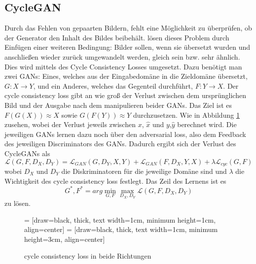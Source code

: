  \subsection{CycleGAN}%
 \label{sub:cyclegan}
 Durch das Fehlen von gepaarten Bildern, fehlt eine Möglichkeit zu überprüfen, ob der Generator den Inhalt des Bildes beibehält. \citeauthor{zhu2017unpaired} \cite{zhu2017unpaired} lösen dieses Problem durch Einfügen einer weiteren Bedingung: Bilder sollen, wenn sie übersetzt wurden und anschließen wieder zurück umgewandelt werden, gleich sein bzw. sehr ähnlich. Dies wird mittels des Cycle Consistency Losses umgesetzt. 
 Dazu benötigt man zwei GANs: Eines, welches aus der Eingabedomäne in die Zieldomäne übersetzt, $G: X \rightarrow Y$, und ein Anderes, welches das Gegenteil durchführt,   $F: Y \rightarrow X$.
 Der cycle consistency loss gibt an wie groß der Verlust zwischen dem ursprünglichen Bild und der Ausgabe nach dem manipulieren beider GANs. 
 Das Ziel ist es $F(G(X))\approx X$ sowie $G(F(Y))\approx Y$ durchzusetzen. Wie in Abbildung \ref{fig:cylce_loss} zusehen, wobei der Verlust jeweils zwischen $x$, $\hat{x}$ und $y$,$\hat{y}$ berechnet wird.
 Die jeweiligen GANs lernen dazu noch über den adversarial loss, also dem Feedback des jeweiligen Discriminators des GANs. 
 Dadurch ergibt sich der Verlust des CycleGANs als
 \[ \mathcal{L}(G,F,D_X,D_Y) = 	\mathcal{L}_{GAN}(G,D_Y,X,Y) + 	\mathcal{L}_{GAN}(F, D_X,Y,X) +\lambda 	\mathcal{L}_{cyc}(G,F)   \]
 wobei $D_X$ und $D_Y$ die Diskriminatoren für die jeweilige Domäne sind und  $\lambda$ die Wichtigkeit des cycle consistency loss festlegt. 
 Das Zeil des Lernens ist es 
 \[G^*,F^* = arg \min_{G,F} \max_{D_X,D_Y} \mathcal{L}(G,F,D_X,D_Y) \] zu lösen.
 
 \begin{figure}
 
 	 = [draw=black, thick, text width=1cm, minimum height=1cm, align=center]  
 	 = [draw=black, thick, text width=1cm, minimum height=3cm, align=center]  
 	\caption[cycle consistency loss]{cycle consistency loss in beide Richtungen}
 	\label{fig:cylce_loss}
 \end{figure}
 
